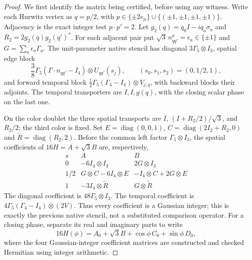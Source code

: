 \documentclass[12pt,a4paper]{article}
\begin{document}
\begin{proof}
We first identify the matrix being certified, before using any witness.
Write each Hurwitz vertex as $q=p/2$, with
$p\in\{\pm2e_\mu\}\cup\{(\pm1,\pm1,\pm1,\pm1)\}$.
Adjacency is the exact integer test $p\cdot p'=2$.
Let $g_2(q)=q_0I-iq_a\sigma_a$ and
$R_2=2g_2(q)g_2(q')^*$. For each adjacent pair put
$\sqrt3\,n_{qq'}^a=\epsilon_a\in\{\pm1\}$ and
$G=\sum_a\epsilon_a\Gamma_a$.
The unit-parameter native stencil has diagonal $3\Gamma_5\otimes I_3$,
spatial edge block
\[
 \frac38\Gamma_5(\Gamma\cdot n_{qq'}-I_4)
       \otimes U_{qq'}(s_j),
 \qquad (s_0,s_1,s_2)=(0,1/2,1),
\]
and forward temporal block
$\frac12\Gamma_5(\Gamma_4-I_4)\otimes V_{j,q}$, with backward
blocks their adjoints. The temporal transporters are $I,I,g(q)$,
with the closing scalar phase on the last one.

On the color doublet the three spatial transports are
$I$, $(I+R_2/2)/\sqrt3$, and $R_2/2$; the third color is fixed.
Set $E=\operatorname{diag}(0,0,1)$,
$C=\operatorname{diag}(2I_2+R_2,0)$ and
$\widetilde R=\operatorname{diag}(R_2,2)$.
Before the common left factor $\Gamma_5\otimes I_3$, the spatial
coefficients of $16H=A+\sqrt3B$ are, respectively,
\[
\begin{array}{c|cc}
 s&A&B\\ \hline
 0&-6I_4\otimes I_3&2G\otimes I_3\\
 1/2&G\otimes C-6I_4\otimes E&-I_4\otimes C+2G\otimes E\\
 1&-3I_4\otimes\widetilde R&G\otimes\widetilde R
\end{array}
\]
The diagonal coefficient is $48\Gamma_5\otimes I_3$.
The temporal coefficient is $4\Gamma_5(\Gamma_4-I_4)\otimes(2V)$.
Thus every coefficient is a Gaussian integer; this is exactly the
previous native stencil, not a substituted comparison operator.
For a closing phase, separate its real and imaginary parts to write
\[
 16H(\phi)=A_0+\sqrt3B+\cos\phi\,C_0+\sin\phi\,D_0,
\]
where the four Gaussian-integer coefficient matrices are constructed
and checked Hermitian using integer arithmetic.


\end{proof}
\end{document}
